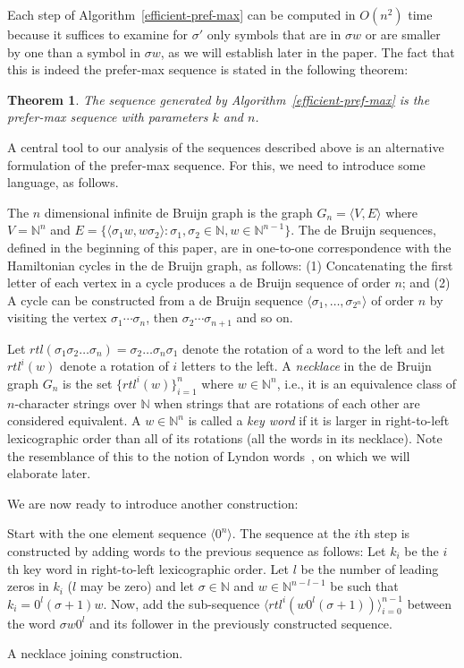 \documentclass{article}
\newtheorem{theorem}{Theorem}
\theoremstyle{definition}
\newcommand{\N}{{\mathbb{N}}}
\newcommand{\T}[1]{\langle{#1}\rangle}
\begin{document}
Each step of Algorithm~\ref{efficient-pref-max} can be computed in $O(n^2)$ time because it suffices to examine for $\sigma'$ only symbols that are in $\sigma w$ or are smaller by one than a symbol in $\sigma w$, as we will establish later in the paper.
The fact that this is indeed the prefer-max sequence is stated in the following theorem:

\begin{theorem}
	The sequence generated by Algorithm~\ref{efficient-pref-max} is the prefer-max sequence with parameters $k$ and $n$.
\end{theorem}
	

A central tool to our analysis of the sequences described above is an alternative formulation of the prefer-max sequence. For this, we need to introduce some language, as follows.

The $n$ dimensional infinite de Bruijn graph is the graph $G_{n}=\T{V,E}$ where $V=\N^n$ and $E=\{ \T{\sigma_1 w, w \sigma_2} \colon \sigma_1,\sigma_2\in\N, w \in \N^{n-1}\}$. The de Bruijn sequences, defined in the beginning of this paper, are in one-to-one correspondence with the Hamiltonian cycles in the de Bruijn graph, as follows: (1) Concatenating the first letter of each vertex in a cycle produces a de Bruijn sequence of order $n$; and (2) A cycle can be constructed from a de Bruijn sequence $\T{\sigma_1,\dots,\sigma_{2^n}}$ of order $n$ by visiting the vertex $\sigma_1\cdots\sigma_n$, then $\sigma_2\cdots\sigma_{n+1}$ and so on.

Let $rtl(\sigma_1\sigma_2\dots\sigma_n) = \sigma_2\dots\sigma_n\sigma_1$ denote the rotation of a word to the left and let $rtl^i(w)$ denote a rotation of $i$ letters to the left. A \emph{necklace} in the de Bruijn graph $G_n$ is the set $\{rtl^i(w)\}_{i=1}^n$ where $w \in \N^n$, i.e., it is an equivalence class of $n$-character strings over $\N$ when strings that are rotations of each other are considered equivalent. A $w\in\N^n$ is called a \emph{key word} if it is larger in right-to-left lexicographic order than all of its rotations (all the words in its necklace).  Note the resemblance of this to the notion of Lyndon words~\cite{Lyndon1954}, on which we will elaborate later.

We are now ready to introduce another construction:


\begin{algorithm}[!h]
	Start with the one element sequence $\T{0^n}$. The sequence at the $i$th step is constructed by adding words to the previous sequence as follows: Let $k_i$ be the $i$th key word in right-to-left lexicographic order. Let $l$ be the number of leading zeros in $k_i$ ($l$ may be zero) and let $\sigma \in \N$ and $w\in\N^{n-l-1}$ be such that $k_i=0^l(\sigma+1)w$. Now, add the sub-sequence $\T{rtl^i(w0^l(\sigma+1))}_{i=0}^{n-1}$ between the word $\sigma w 0^l$ and its follower in the previously constructed sequence.
	\caption{A necklace joining construction.}
	\label{necklace-joining}
\end{algorithm}
\end{document}
